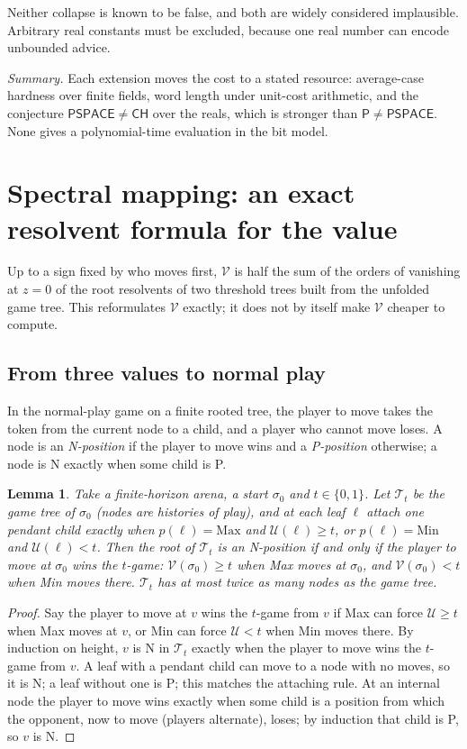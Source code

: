 \documentclass[11pt]{amsart}
\theoremstyle{plain}
\newtheorem{lemma}[theorem]{Lemma}
\theoremstyle{definition}
\theoremstyle{remark}
\numberwithin{equation}{section}
\newcommand{\val}{\mathcal{V}}            %
\newcommand{\pay}{\mathcal{U}}            %
\newcommand{\cls}[1]{\mathsf{#1}}
\newcommand{\PSPACE}{\cls{PSPACE}}
\newcommand{\Pclass}{\cls{P}}
\newcommand{\CH}{\cls{CH}}
\begin{document}
Neither collapse is known to be false, and both are widely considered implausible. Arbitrary real constants must be excluded, because one real number can encode unbounded advice.

\noindent\emph{Summary.} Each extension moves the cost to a stated resource: average-case hardness over finite fields, word length under unit-cost arithmetic, and the conjecture $\PSPACE\neq\CH$ over the reals, which is stronger than $\Pclass\neq\PSPACE$. None gives a polynomial-time evaluation in the bit model.

\section{Spectral mapping: an exact resolvent formula for the value}\label{sec:spectral}

Up to a sign fixed by who moves first, $\val$ is half the sum of the orders of vanishing at $z=0$ of the root resolvents of two threshold trees built from the unfolded game tree. This reformulates $\val$ exactly; it does not by itself make $\val$ cheaper to compute.

\subsection{From three values to normal play}
In the normal-play game on a finite rooted tree, the player to move takes the token from the current node to a child, and a player who cannot move loses. A node is an \emph{N-position} if the player to move wins and a \emph{P-position} otherwise; a node is N exactly when some child is P.

\begin{lemma}\label{lem:threshold}
Take a finite-horizon arena, a start $\sigma_0$ and $t\in\{0,1\}$. Let $\mathcal T_t$ be the game tree of $\sigma_0$ (nodes are histories of play), and at each leaf $\ell$ attach one pendant child exactly when $p(\ell)=\mathrm{Max}$ and $\pay(\ell)\ge t$, or $p(\ell)=\mathrm{Min}$ and $\pay(\ell)<t$. Then the root of $\mathcal T_t$ is an N-position if and only if the player to move at $\sigma_0$ wins the $t$-game: $\val(\sigma_0)\ge t$ when Max moves at $\sigma_0$, and $\val(\sigma_0)<t$ when Min moves there. $\mathcal T_t$ has at most twice as many nodes as the game tree.
\end{lemma}

\begin{proof}
Say the player to move at $v$ wins the $t$-game from $v$ if Max can force $\pay\ge t$ when Max moves at $v$, or Min can force $\pay<t$ when Min moves there. By induction on height, $v$ is N in $\mathcal T_t$ exactly when the player to move wins the $t$-game from $v$. A leaf with a pendant child can move to a node with no moves, so it is N; a leaf without one is P; this matches the attaching rule. At an internal node the player to move wins exactly when some child is a position from which the opponent, now to move (players alternate), loses; by induction that child is P, so $v$ is N.
\end{proof}
\end{document}
